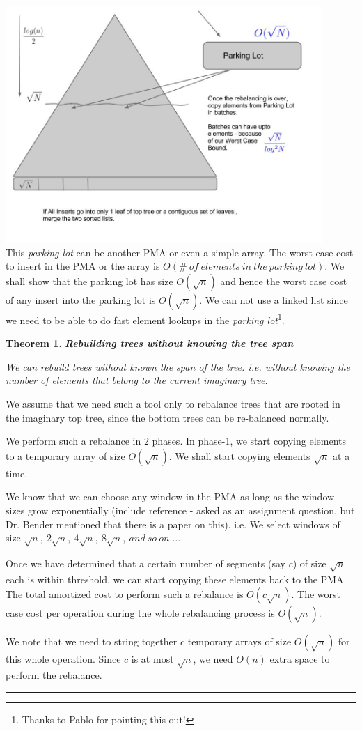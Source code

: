 \documentclass{article}
\newenvironment{proof}{{\bf Proof:  }}{\hfill\rule{2mm}{2mm}}
\newtheorem{theorem}[fact]{Theorem}
\begin{document}
\includegraphics[width=120mm]{img1.jpg} \\


This \textit{parking lot} can be another PMA or even a simple array. 
The worst case cost to insert in the PMA or the array is
$O(\#\ of\ elements\ in\ the\ parking\ lot)$. We shall show that the
parking lot has size $O(\sqrt{n})$ and hence the worst case cost of
any insert into the parking lot is $O(\sqrt{n})$. We can not use a
linked list since we need to be able to do fast element lookups in the
\textit{parking lot}\footnote{Thanks to Pablo for pointing this out!}.

\begin{theorem}
\textbf{Rebuilding trees without knowing the tree span}

We can rebuild trees without known the span of the tree. i.e. without
knowing the number of elements that belong to the current imaginary
tree.
\end{theorem}

\begin{proof}
We assume that we need such a tool only to rebalance trees that are
rooted in the imaginary top tree, since the bottom trees can be
re-balanced normally.

We perform such a rebalance in 2 phases. In phase-1, we start copying
elements to a temporary array of size $O(\sqrt{n})$. We shall start
copying elements $\sqrt{n}$ at a time.

We know that we can choose any window in the PMA as long as the window
sizes grow exponentially (include reference - asked as an assignment
question, but Dr. Bender mentioned that there is a paper on
this). i.e. We select windows of size
$\sqrt{n},\ 2\sqrt{n},\ 4\sqrt{n},\ 8\sqrt{n},\ and\ so\ on\ldots{}$.

Once we have determined that a certain number of segments (say $c$) of
size $\sqrt{n}$ each is within threshold, we can start copying these
elements back to the PMA. The total amortized cost to perform such a
rebalance is $O(c\sqrt{n})$. The worst case cost per operation during
the whole rebalancing process is $O(\sqrt{n})$.

We note that we need to string together $c$ temporary arrays of size
$O(\sqrt{n})$ for this whole operation. Since $c$ is at most
$\sqrt{n}$, we need $O(n)$ extra space to perform the rebalance.
\end{proof}
\end{document}
